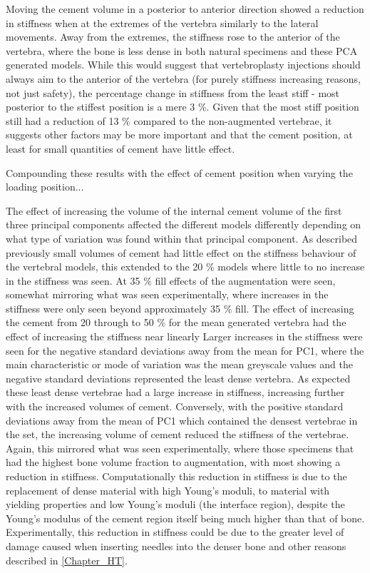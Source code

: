 Moving the cement volume in a posterior to anterior direction showed a
reduction in stiffness when at the extremes of the vertebra similarly to the
lateral movements.  Away from the extremes, the stiffness rose to the anterior
of the vertebra, where the bone is less dense in both natural specimens and
these PCA generated models.  While this would suggest that vertebroplasty
injections should always aim to the anterior of the vertebra (for purely
stiffness increasing reasons, not just safety), the percentage change in
stiffness from the least stiff - most posterior to the stiffest position is a
mere 3 \%.  Given that the most stiff position still had a reduction of 13 \%
compared to the non-augmented vertebrae, it suggests other factors may be more
important and that the cement position, at least for small quantities of cement
have little effect.

Compounding these results with the effect of cement position when varying the
loading position... %

The effect of increasing the volume of the internal cement volume of the first
three principal components affected the different models differently depending
on what type of variation was found within that principal component.  As
described previously small volumes of cement had little effect on the stiffness
behaviour of the vertebral models, this extended to the 20 \% models where
little to no increase in the stiffness was seen.  At 35 \% fill effects of the
augmentation were seen, somewhat mirroring what was seen experimentally, where
increases in the stiffness were only seen beyond approximately 35 \% fill.  The
effect of increasing the cement from 20 through to 50 \% for the mean generated
vertebra had the effect of increasing the stiffness near linearly %
Larger increases in the stiffness were seen for the negative standard
deviations away from the mean for PC1, where the main characteristic or mode of
variation was the mean greyscale values and the negative standard deviations
represented the least dense vertebra.  As expected these least dense vertebrae
had a large increase in stiffness, increasing further with the increased
volumes of cement.  Conversely, with the positive standard deviations away from
the mean of PC1 which contained the densest vertebrae in the set, the
increasing volume of cement reduced the stiffness of the vertebrae.  Again,
this mirrored what was seen experimentally, where those specimens that had the
highest bone volume fraction %
to augmentation, with most showing a reduction in stiffness.  Computationally
this reduction in stiffness is due to the replacement of dense material with
high Young's moduli, to material with yielding properties and low Young's
moduli (the interface region), despite the Young's modulus of the cement region
itself being much higher than that of bone.  Experimentally, this reduction in
stiffness could be due to the greater level of damage caused when inserting
needles into the denser bone and other reasons described in \cref{Chapter_HT}.

